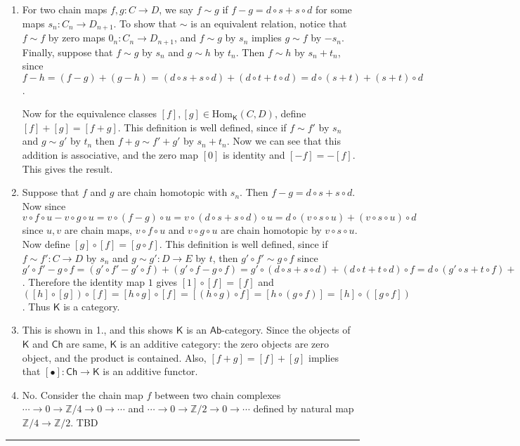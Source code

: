 \begin{solution}
\begin{enumerate}
\item For two chain maps $f,g:C\rightarrow D$, we say $f\sim g$ if $f-g=d\circ s+s\circ d$ for some maps $s_n:C_n\rightarrow D_{n+1}$. To show that $\sim$ is an equivalent relation, notice that $f\sim f$ by zero maps $0_n:C_n\rightarrow D_{n+1}$, and $f\sim g$ by $s_n$ implies $g\sim f$ by $-s_n$. Finally, suppose that $f\sim g$ by $s_n$ and $g\sim h$ by $t_n$. Then $f\sim h$ by $s_n+t_n$, since $f-h=(f-g)+(g-h)=(d\circ s+s\circ d)+(d\circ t+t\circ d)=d\circ(s+t)+(s+t)\circ d$.

Now for the equivalence classes $[f],[g]\in\textrm{Hom}_{\mathsf{K}}(C,D)$, define $[f]+[g]=[f+g]$. This definition is well defined, since if $f\sim f'$ by $s_n$ and $g\sim g'$ by $t_n$ then $f+g\sim f'+g'$ by $s_n+t_n$. Now we can see that this addition is associative, and the zero map $[0]$ is identity and $[-f]=-[f]$. This gives the result.
\item Suppose that $f$ and $g$ are chain homotopic with $s_n$. Then $f-g=d\circ s+s\circ d$. Now since $v\circ f\circ u-v\circ g\circ u=v\circ (f-g)\circ u=v\circ (d\circ s+s\circ d)\circ u=d\circ (v\circ s\circ u)+(v\circ s\circ u)\circ d$ since $u,v$ are chain maps, $v\circ f\circ u$ and $v\circ g\circ u$ are chain homotopic by $v\circ s\circ u$. Now define $[g]\circ[f]=[g\circ f]$. This definition is well defined, since if $f\sim f':C\rightarrow D$ by $s_n$ and $g\sim g':D\rightarrow E$ by $t$, then $g'\circ f'\sim g\circ f$ since $g'\circ f'-g\circ f=(g'\circ f'-g'\circ f)+(g'\circ f-g\circ f)=g'\circ(d\circ s+s\circ d)+(d\circ t+t\circ d)\circ f=d\circ (g'\circ s+t\circ f)+(g'\circ s+t\circ f)\circ d$. Therefore the identity map $1$ gives $[1]\circ [f]=[f]$ and $([h]\circ [g])\circ [f]=[h\circ g]\circ [f]=[(h\circ g)\circ f]=[h\circ (g\circ f)]=[h]\circ([g\circ f])$. Thus $\mathsf{K}$ is a category.
\item This is shown in 1., and this shows $\mathsf{K}$ is an $\mathsf{Ab}$-category. Since the objects of $\mathsf{K}$ and $\mathsf{Ch}$ are same, $\mathsf{K}$ is an additive category: the zero objects are zero object, and the product is contained. Also, $[f+g]=[f]+[g]$ implies that $[\bullet]:\mathsf{Ch}\rightarrow \mathsf{K}$ is an additive functor.
\item No. Consider the chain map $f$ between two chain complexes $\cdots\rightarrow 0\rightarrow \mathbb{Z}/4\rightarrow 0\rightarrow \cdots$ and $\cdots\rightarrow 0\rightarrow \mathbb{Z}/2\rightarrow 0\rightarrow \cdots$ defined by natural map $\mathbb{Z}/4\rightarrow \mathbb{Z}/2$. TBD
\end{enumerate}
\end{solution}
\noindent\rule{\textwidth}{1pt}
\newline